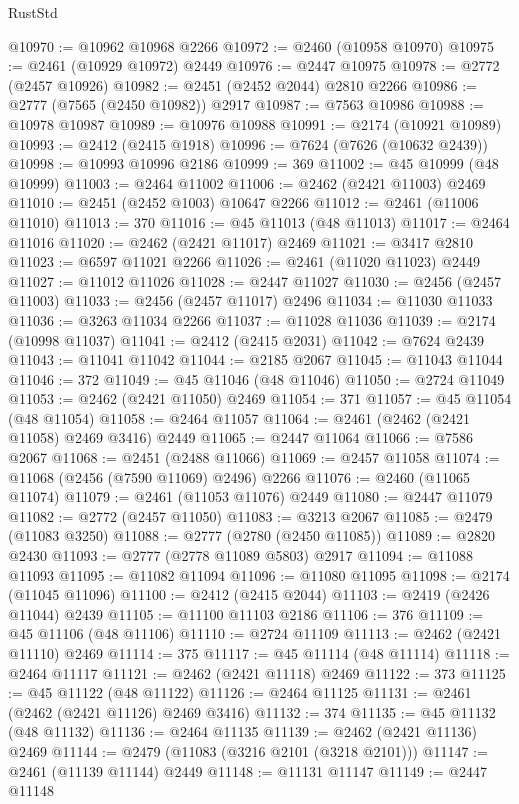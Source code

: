 \begin{lexlean}{RustStd}
\begin{coremodule}
@10970 := @10962 @10968 @2266
@10972 := @2460 (@10958 @10970)
@10975 := @2461 (@10929 @10972) @2449
@10976 := @2447 @10975
@10978 := @2772 (@2457 @10926)
@10982 := @2451 (@2452 @2044) @2810 @2266
@10986 := @2777 (@7565 (@2450 @10982)) @2917
@10987 := @7563 @10986
@10988 := @10978 @10987
@10989 := @10976 @10988
@10991 := @2174 (@10921 @10989)
@10993 := @2412 (@2415 @1918)
@10996 := @7624 (@7626 (@10632 @2439))
@10998 := @10993 @10996 @2186
@10999 := 369
@11002 := @45 @10999 (@48 @10999)
@11003 := @2464 @11002
@11006 := @2462 (@2421 @11003) @2469
@11010 := @2451 (@2452 @1003) @10647 @2266
@11012 := @2461 (@11006 @11010)
@11013 := 370
@11016 := @45 @11013 (@48 @11013)
@11017 := @2464 @11016
@11020 := @2462 (@2421 @11017) @2469
@11021 := @3417 @2810
@11023 := @6597 @11021 @2266
@11026 := @2461 (@11020 @11023) @2449
@11027 := @11012 @11026
@11028 := @2447 @11027
@11030 := @2456 (@2457 @11003)
@11033 := @2456 (@2457 @11017) @2496
@11034 := @11030 @11033
@11036 := @3263 @11034 @2266
@11037 := @11028 @11036
@11039 := @2174 (@10998 @11037)
@11041 := @2412 (@2415 @2031)
@11042 := @7624 @2439
@11043 := @11041 @11042
@11044 := @2185 @2067
@11045 := @11043 @11044
@11046 := 372
@11049 := @45 @11046 (@48 @11046)
@11050 := @2724 @11049
@11053 := @2462 (@2421 @11050) @2469
@11054 := 371
@11057 := @45 @11054 (@48 @11054)
@11058 := @2464 @11057
@11064 := @2461 (@2462 (@2421 @11058) @2469 @3416) @2449
@11065 := @2447 @11064
@11066 := @7586 @2067
@11068 := @2451 (@2488 @11066)
@11069 := @2457 @11058
@11074 := @11068 (@2456 (@7590 @11069) @2496) @2266
@11076 := @2460 (@11065 @11074)
@11079 := @2461 (@11053 @11076) @2449
@11080 := @2447 @11079
@11082 := @2772 (@2457 @11050)
@11083 := @3213 @2067
@11085 := @2479 (@11083 @3250)
@11088 := @2777 (@2780 (@2450 @11085))
@11089 := @2820 @2430
@11093 := @2777 (@2778 @11089 @5803) @2917
@11094 := @11088 @11093
@11095 := @11082 @11094
@11096 := @11080 @11095
@11098 := @2174 (@11045 @11096)
@11100 := @2412 (@2415 @2044)
@11103 := @2419 (@2426 @11044) @2439
@11105 := @11100 @11103 @2186
@11106 := 376
@11109 := @45 @11106 (@48 @11106)
@11110 := @2724 @11109
@11113 := @2462 (@2421 @11110) @2469
@11114 := 375
@11117 := @45 @11114 (@48 @11114)
@11118 := @2464 @11117
@11121 := @2462 (@2421 @11118) @2469
@11122 := 373
@11125 := @45 @11122 (@48 @11122)
@11126 := @2464 @11125
@11131 := @2461 (@2462 (@2421 @11126) @2469 @3416)
@11132 := 374
@11135 := @45 @11132 (@48 @11132)
@11136 := @2464 @11135
@11139 := @2462 (@2421 @11136) @2469
@11144 := @2479 (@11083 (@3216 @2101 (@3218 @2101)))
@11147 := @2461 (@11139 @11144) @2449
@11148 := @11131 @11147
@11149 := @2447 @11148

\end{coremodule}
\end{lexlean}

